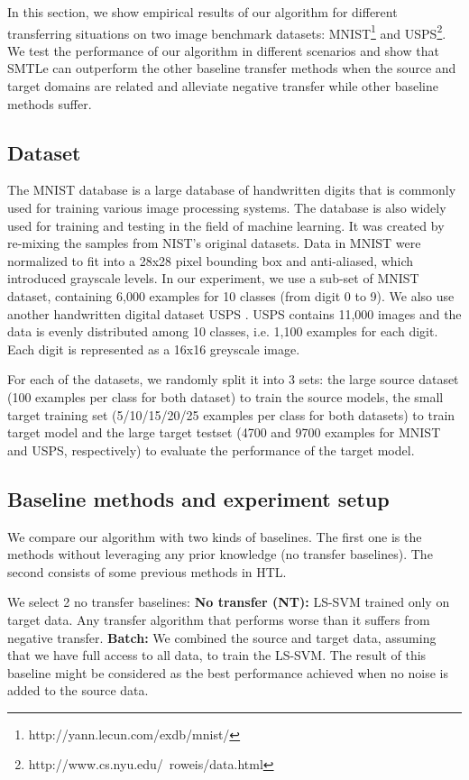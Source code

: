 In this section, we show empirical results of our algorithm for different transferring situations on two image benchmark datasets: MNIST\footnote{http://yann.lecun.com/exdb/mnist/} \cite{lampert2009learning} and USPS\footnote{http://www.cs.nyu.edu/~roweis/data.html}. We test the performance of our algorithm in different scenarios and show that SMTLe can outperform the other baseline transfer methods when the source and target domains are related and alleviate negative transfer while other baseline methods suffer.
\subsection{Dataset}
The MNIST database \cite{lecun1998gradient} is a large database of handwritten digits that is commonly used for training various image processing systems. The database is also widely used for training and testing in the field of machine learning. It was created by re-mixing the samples from NIST's original datasets. Data in MNIST were normalized to fit into a 28x28 pixel bounding box and anti-aliased, which introduced grayscale levels. In our experiment, we use a sub-set of MNIST dataset, containing 6,000 examples for 10 classes (from digit 0 to 9). We also use another handwritten digital dataset USPS \cite{hull1994database}. USPS contains 11,000 images and the data is evenly distributed among 10 classes, i.e. 1,100 examples for each digit. Each digit is represented as a 16x16 greyscale image.

For each of the datasets, we randomly split it into 3 sets: the large source dataset (100 examples per class for both dataset) to train the source models, the small target training set (5/10/15/20/25 examples per class for both datasets) to train target model and the large target testset (4700 and 9700 examples for MNIST and USPS, respectively) to evaluate the performance of the target model.

\subsection{Baseline methods and experiment setup}
We compare our algorithm with two kinds of baselines. The first one is the methods without leveraging any prior knowledge (no transfer baselines). The second consists of some previous methods in HTL. 

We select 2 no transfer baselines:
\textbf{No transfer (NT):} LS-SVM trained only on target data. Any transfer algorithm that performs worse than it suffers from negative transfer. \textbf{Batch:} We combined the source and target data, assuming that we have full access to all data, to train the LS-SVM. The result of this baseline might be considered as the best performance achieved when no noise is added to the source data.


